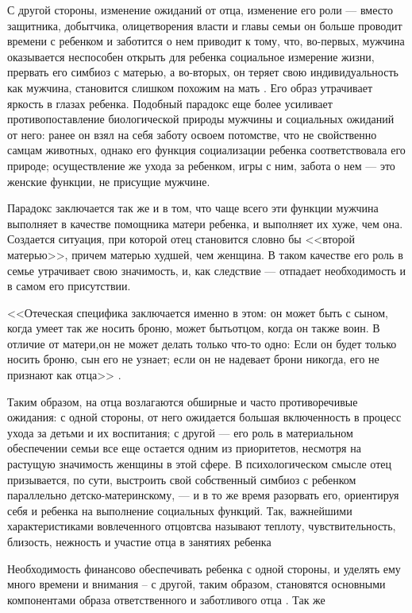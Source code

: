 \documentclass{../../common/thesisbyxetex}
\begin{document}
С другой стороны, изменение ожиданий от отца, изменение его роли --- вместо защитника, добытчика, 
олицетворения власти и главы семьи он больше проводит времени с ребенком и заботится о нем 
приводит к тому, что, во-первых, мужчина оказывается неспособен открыть для ребенка социальное 
измерение жизни, прервать его симбиоз с матерью, а во-вторых, он теряет свою индивидуальность как 
мужчина, становится слишком похожим на мать \cite[285]{zo}. Его образ утрачивает 
яркость в глазах ребенка. Подобный парадокс еще более усиливает противопоставление биологической 
природы мужчины и социальных ожиданий от него: ранее он взял на себя заботу освоем потомстве, что 
не свойственно самцам животных, однако его функция социализации ребенка соответствовала его 
природе; осуществление же ухода за ребенком, игры  с ним, забота о нем --- это женские функции, не 
присущие мужчине.

Парадокс заключается так же и в том, что чаще всего эти функции мужчина выполняет в качестве 
помощника матери ребенка, и выполняет их хуже, чем она. Создается ситуация, при 
которой отец становится словно бы <<второй матерью>>, причем матерью худшей, чем женщина. В таком 
качестве его роль в семье утрачивает свою значимость, и, как следствие --- отпадает 
необходимость и в самом его присутствии.

<<Отеческая специфика заключается именно в этом: он может быть с сыном, когда умеет так же носить 
броню, может бытьотцом, когда он также воин. В отличие от матери,он не может делать только 
что-то одно: Если он будет только носить броню, сын его не узнает; если он не надевает брони 
никогда, его не признают как отца>> \cite[287]{zo}.



Таким образом, на отца возлагаются обширные и часто противоречивые ожидания: с одной стороны, от 
него ожидается большая включенность в процесс ухода за детьми и их воспитания; с другой --- его 
роль в материальном обеспечении семьи все еще остается одним из приоритетов, несмотря на растущую 
значимость женщины в этой сфере. В психологическом смысле отец призывается, по сути, выстроить свой 
собственный симбиоз с ребенком параллельно детско-материнскому, --- и в то же время разорвать его, 
ориентируя себя и ребенка на выполнение социальных функций. Так, важнейшими характеристиками 
вовлеченного отцовтсва называют теплоту, чувствительность, близость, нежность и участие отца в 
занятиях ребенка \cite[129]{f21}

Необходимость финансово обеспечивать ребенка с одной стороны, и уделять ему много времени и 
внимания -- с другой, таким образом, становятся основными компонентами образа ответственного и 
заботливого отца \cite[129]{f21}. Так же 
\end{document}
